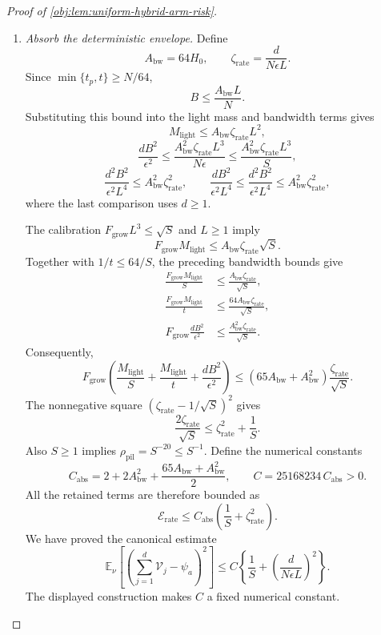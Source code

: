 \documentclass[11pt]{article}
\begin{document}
\begin{proof}[Proof of \cref{obj:lem:uniform-hybrid-arm-risk}]
\begin{enumerate}
\item \textit{Absorb the deterministic envelope.}
Define
\[
A_{\mathrm{bw}}=64H_0,
\qquad
\zeta_{\mathrm{rate}}=\frac{d}{N\epsilon L}.
\]
Since \(\min\{t_p,t\}\ge N/64\),
\[
B\le\frac{A_{\mathrm{bw}}L}{N}.
\]
Substituting this bound into the light mass and bandwidth terms gives
\[
M_{\mathrm{light}}
\le A_{\mathrm{bw}}\zeta_{\mathrm{rate}}L^2,
\]
\[
\frac{dB^2}{\epsilon^2}
\le
\frac{A_{\mathrm{bw}}^2\zeta_{\mathrm{rate}}L^3}{N\epsilon}
\le
\frac{A_{\mathrm{bw}}^2\zeta_{\mathrm{rate}}L^3}{S},
\]
\[
\frac{d^2B^2}{\epsilon^2L^4}
\le A_{\mathrm{bw}}^2\zeta_{\mathrm{rate}}^2,
\qquad
\frac{dB^2}{\epsilon^2L^4}
\le\frac{d^2B^2}{\epsilon^2L^4}
\le A_{\mathrm{bw}}^2\zeta_{\mathrm{rate}}^2,
\]
where the last comparison uses \(d\ge1\).

The calibration \(F_{\mathrm{grow}}L^3\le\sqrt S\) and \(L\ge1\) imply
\[
F_{\mathrm{grow}}M_{\mathrm{light}}
\le A_{\mathrm{bw}}\zeta_{\mathrm{rate}}\sqrt S.
\]
Together with \(1/t\le64/S\), the preceding bandwidth bounds give
\[
\begin{aligned}
\frac{F_{\mathrm{grow}}M_{\mathrm{light}}}{S}
&\le\frac{A_{\mathrm{bw}}\zeta_{\mathrm{rate}}}{\sqrt S},\\
\frac{F_{\mathrm{grow}}M_{\mathrm{light}}}{t}
&\le\frac{64A_{\mathrm{bw}}\zeta_{\mathrm{rate}}}{\sqrt S},\\
F_{\mathrm{grow}}\frac{dB^2}{\epsilon^2}
&\le\frac{A_{\mathrm{bw}}^2\zeta_{\mathrm{rate}}}{\sqrt S}.
\end{aligned}
\]
Consequently,
\[
F_{\mathrm{grow}}
\left(
\frac{M_{\mathrm{light}}}{S}
+\frac{M_{\mathrm{light}}}{t}
+\frac{dB^2}{\epsilon^2}
\right)
\le
(65A_{\mathrm{bw}}+A_{\mathrm{bw}}^2)
\frac{\zeta_{\mathrm{rate}}}{\sqrt S}.
\]
The nonnegative square
\((\zeta_{\mathrm{rate}}-1/\sqrt S)^2\) gives
\[
\frac{2\zeta_{\mathrm{rate}}}{\sqrt S}
\le\zeta_{\mathrm{rate}}^2+\frac1S.
\]
Also \(S\ge1\) implies \(\rho_{\mathrm{pil}}=S^{-20}\le S^{-1}\).
Define the numerical constants
\[
C_{\mathrm{abs}}
=
2+2A_{\mathrm{bw}}^2
+\frac{65A_{\mathrm{bw}}+A_{\mathrm{bw}}^2}{2},
\qquad
C=25168234\,C_{\mathrm{abs}}>0.
\]
All the retained terms are therefore bounded as
\[
\mathscr E_{\mathrm{rate}}
\le
C_{\mathrm{abs}}
\left(\frac1S+\zeta_{\mathrm{rate}}^2\right).
\]
We have proved the canonical estimate
\[
\mathbb E_\nu\left[
\left(\sum_{j=1}^d\mathcal V_j-\psi_a\right)^2
\right]
\le
C\left\{
\frac1S+\left(\frac{d}{N\epsilon L}\right)^2
\right\}.
\]
The displayed construction makes \(C\) a fixed numerical constant.


\end{enumerate}
\end{proof}
\end{document}
